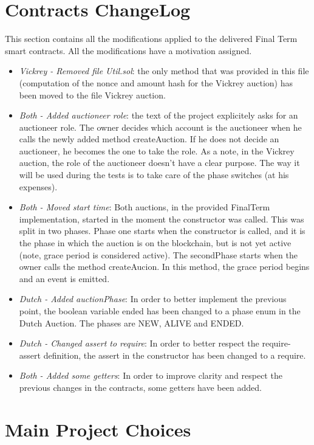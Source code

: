 \documentclass[11pt, a4paper]{report}
\begin{document}
\section*{Contracts ChangeLog}
This section contains all the modifications applied to the delivered Final Term smart contracts. All the modifications have a motivation assigned.
\begin{itemize}
	\item \emph{Vickrey - Removed file Util.sol}: the only method that was provided in this file (computation of the nonce and amount hash for the Vickrey auction) has been moved to the file Vickrey auction. 
	\item \emph{Both - Added auctioneer role}: the text of the project explicitely asks for an auctioneer role. The owner decides which account is the auctioneer when he calls the newly added method createAuction. If he does not decide an auctioneer, he becomes the one to take the role. As a note, in the Vickrey auction, the role of the auctioneer doesn't have a clear purpose. The way it will be used during the tests is to take care of the phase switches (at his expenses).
	\item \emph{Both - Moved start time}: Both auctions, in the provided FinalTerm implementation, started in the moment the constructor was called. This was split in two phases. Phase one starts when the constructor is called, and it is the phase in which the auction is on the blockchain, but is not yet active (note, grace period is considered active). The secondPhase starts when the owner calls the method createAucion. In this method, the grace period begins and an event is emitted.
	\item \emph{Dutch - Added auctionPhase}: In order to better implement the previous point, the boolean variable ended has been changed to a phase enum in the Dutch Auction. The phases are NEW, ALIVE and ENDED.
	\item \emph{Dutch - Changed assert to require}: In order to better respect the require-assert definition, the assert in the constructor has been changed to a require.
	\item \emph{Both - Added some getters}: In order to improve clarity and respect the previous changes in the contracts, some getters have been added.
\end{itemize}

\section*{Main Project Choices}
	
	
\end{document}
